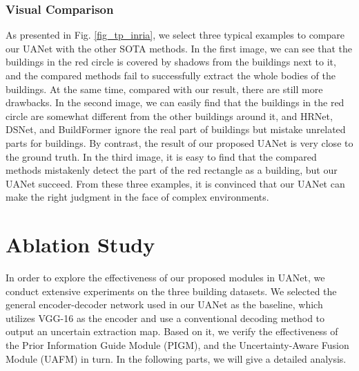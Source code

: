 \documentclass[lettersize,journal]{IEEEtran}
\begin{document}
\begin{figure*}
\centering
{}
\hfil
{}
\hfil
{}
\hfil
{}
\hfil
{}
\hfil
{}
\hfil
{}
\hfil
\caption{Visual Comparison on Inria building dataset.}
\label{fig_tp_inria}
\vspace{-1.0em}
\end{figure*}


\subsubsection{Visual Comparison}
As presented in Fig. \ref{fig_tp_inria}, we select three typical examples to compare our UANet with the other SOTA methods. In the first image, we can see that the buildings in the red circle is covered by shadows from the buildings next to it, and the compared methods fail to successfully extract the whole bodies of the buildings.
At the same time, compared with our result, there are still more drawbacks. In the second image, we can easily find that the buildings in the red circle are somewhat different from the other buildings around it, and HRNet, DSNet, and BuildFormer ignore the real part of buildings but mistake unrelated parts for buildings. By contrast, the result of our proposed UANet is very close to the ground truth. In the third image, it is easy to find that the compared methods mistakenly detect the part of the red rectangle as a building, but our UANet succeed. From these three examples, it is convinced that our UANet can make the right judgment in the face of complex environments.

\section{Ablation Study}
In order to explore the effectiveness of our proposed modules in UANet, we conduct extensive experiments on the three building datasets. We selected the general encoder-decoder network used in our UANet as the baseline, which utilizes VGG-16 as the encoder and use a conventional decoding method to output an uncertain extraction map. Based on it, we verify the effectiveness of the Prior Information Guide Module (PIGM), and the Uncertainty-Aware Fusion Module (UAFM) in turn. In the following parts, we will give a detailed analysis. 
\end{document}
